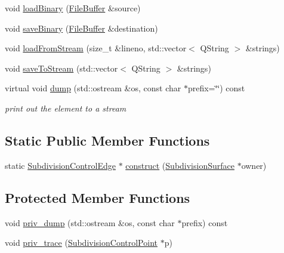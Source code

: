 \begin{DoxyCompactItemize}
\item 
void \hyperlink{classShipCADGeometry_1_1SubdivisionControlEdge_a0f48c4ce176a5de42e0a7c741aa129f5}{load\-Binary} (\hyperlink{classShipCADGeometry_1_1FileBuffer}{File\-Buffer} \&source)
\item 
void \hyperlink{classShipCADGeometry_1_1SubdivisionControlEdge_a572f4331ef0ab6f241583fc8d36cb93e}{save\-Binary} (\hyperlink{classShipCADGeometry_1_1FileBuffer}{File\-Buffer} \&destination)
\item 
void \hyperlink{classShipCADGeometry_1_1SubdivisionControlEdge_a7c6098254d4a92c44d01c3e247b29782}{load\-From\-Stream} (size\-\_\-t \&lineno, std\-::vector$<$ Q\-String $>$ \&strings)
\item 
void \hyperlink{classShipCADGeometry_1_1SubdivisionControlEdge_a21c0e8b4d4cd138ddd0bbcc707775040}{save\-To\-Stream} (std\-::vector$<$ Q\-String $>$ \&strings)
\item 
virtual void \hyperlink{classShipCADGeometry_1_1SubdivisionControlEdge_abdfa96ff05eff404214a92d38d7eb715}{dump} (std\-::ostream \&os, const char $\ast$prefix=\char`\"{}\char`\"{}) const 
\begin{DoxyCompactList}\small\item\em print out the element to a stream \end{DoxyCompactList}\end{DoxyCompactItemize}
\subsection*{Static Public Member Functions}
\begin{DoxyCompactItemize}
\item 
static \hyperlink{classShipCADGeometry_1_1SubdivisionControlEdge}{Subdivision\-Control\-Edge} $\ast$ \hyperlink{classShipCADGeometry_1_1SubdivisionControlEdge_a20fc507b201766b6e3d0560595946fac}{construct} (\hyperlink{classShipCADGeometry_1_1SubdivisionSurface}{Subdivision\-Surface} $\ast$owner)
\end{DoxyCompactItemize}
\subsection*{Protected Member Functions}
\begin{DoxyCompactItemize}
\item 
void \hyperlink{classShipCADGeometry_1_1SubdivisionControlEdge_acc4cee57db50beb1dcc6361f7f2c62af}{priv\-\_\-dump} (std\-::ostream \&os, const char $\ast$prefix) const 
\item 
void \hyperlink{classShipCADGeometry_1_1SubdivisionControlEdge_aec6ff8caa6996ae5a9d2e58d5d2b0344}{priv\-\_\-trace} (\hyperlink{classShipCADGeometry_1_1SubdivisionControlPoint}{Subdivision\-Control\-Point} $\ast$p)
\end{DoxyCompactItemize}
